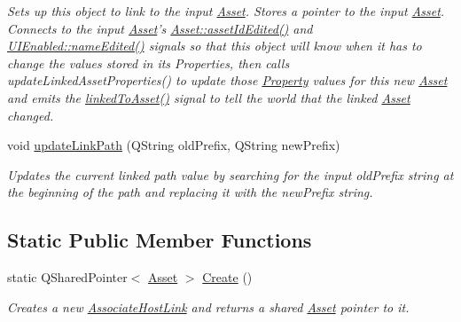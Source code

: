 \begin{DoxyCompactItemize}
\begin{DoxyCompactList}\small\item\em Sets up this object to link to the input \hyperlink{class_picto_1_1_asset}{Asset}. Stores a pointer to the input \hyperlink{class_picto_1_1_asset}{Asset}. Connects to the input \hyperlink{class_picto_1_1_asset}{Asset}'s \hyperlink{class_picto_1_1_asset_af9dc9a5935284306615aa5e19a5be49e}{Asset\-::asset\-Id\-Edited()} and \hyperlink{class_picto_1_1_u_i_enabled_a323aef51f96a9a8a6102e768add07226}{U\-I\-Enabled\-::name\-Edited()} signals so that this object will know when it has to change the values stored in its Properties, then calls update\-Linked\-Asset\-Properties() to update those \hyperlink{class_picto_1_1_property}{Property} values for this new \hyperlink{class_picto_1_1_asset}{Asset} and emits the \hyperlink{class_picto_1_1_associate_host_link_a22c3514b038fa329e1fe266a75fc261e}{linked\-To\-Asset()} signal to tell the world that the linked \hyperlink{class_picto_1_1_asset}{Asset} changed. \end{DoxyCompactList}\item 
void \hyperlink{class_picto_1_1_associate_host_link_ae94465275b4dc05bfd3752e9c5cd8d54}{update\-Link\-Path} (Q\-String old\-Prefix, Q\-String new\-Prefix)
\begin{DoxyCompactList}\small\item\em Updates the current linked path value by searching for the input old\-Prefix string at the beginning of the path and replacing it with the new\-Prefix string. \end{DoxyCompactList}\end{DoxyCompactItemize}
\subsection*{Static Public Member Functions}
\begin{DoxyCompactItemize}
\item 
\hypertarget{class_picto_1_1_associate_host_link_a41ca7d6d94ea20da5d716e27bd5e8e7a}{static Q\-Shared\-Pointer$<$ \hyperlink{class_picto_1_1_asset}{Asset} $>$ \hyperlink{class_picto_1_1_associate_host_link_a41ca7d6d94ea20da5d716e27bd5e8e7a}{Create} ()}\label{class_picto_1_1_associate_host_link_a41ca7d6d94ea20da5d716e27bd5e8e7a}

\begin{DoxyCompactList}\small\item\em Creates a new \hyperlink{class_picto_1_1_associate_host_link}{Associate\-Host\-Link} and returns a shared \hyperlink{class_picto_1_1_asset}{Asset} pointer to it. \end{DoxyCompactList}\end{DoxyCompactItemize}
